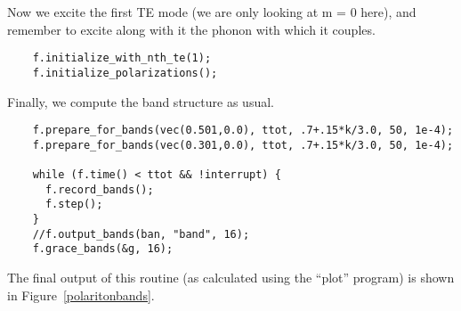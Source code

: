 Now we excite the first TE mode (we are only looking at m = 0 here), and
remember to excite along with it the phonon with which it couples.

\begin{verbatim}
    f.initialize_with_nth_te(1);
    f.initialize_polarizations();
\end{verbatim}

Finally, we compute the band structure as usual.

\begin{verbatim}
    f.prepare_for_bands(vec(0.501,0.0), ttot, .7+.15*k/3.0, 50, 1e-4);
    f.prepare_for_bands(vec(0.301,0.0), ttot, .7+.15*k/3.0, 50, 1e-4);
    
    while (f.time() < ttot && !interrupt) {
      f.record_bands();
      f.step();
    }
    //f.output_bands(ban, "band", 16);
    f.grace_bands(&g, 16);
\end{verbatim}
\begin{comment}
    //fflush(ban);
  }
  //fclose(ban);
}
\end{comment}

The final output of this routine (as calculated using the ``plot'' program)
is shown in Figure~\ref{polaritonbands}.
